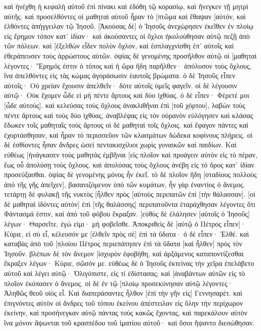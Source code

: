 καὶ ἠνέχθη ἡ κεφαλὴ αὐτοῦ ἐπὶ πίνακι καὶ ἐδόθη τῷ κορασίῳ, καὶ ἤνεγκεν τῇ μητρὶ αὐτῆς. 
καὶ προσελθόντες οἱ μαθηταὶ αὐτοῦ ἦραν τὸ [πτῶμα καὶ ἔθαψαν [αὐτόν, καὶ ἐλθόντες ἀπήγγειλαν τῷ Ἰησοῦ. 
[Ἀκούσας δὲ] ὁ Ἰησοῦς ἀνεχώρησεν ἐκεῖθεν ἐν πλοίῳ εἰς ἔρημον τόπον κατ᾽ ἰδίαν· καὶ ἀκούσαντες οἱ ὄχλοι ἠκολούθησαν αὐτῷ πεζῇ ἀπὸ τῶν πόλεων. 
καὶ [ἐξελθὼν εἶδεν πολὺν ὄχλον, καὶ ἐσπλαγχνίσθη ἐπ᾽ αὐτοῖς καὶ ἐθεράπευσεν τοὺς ἀρρώστους αὐτῶν. 
ὀψίας δὲ γενομένης προσῆλθον αὐτῷ οἱ [μαθηταὶ λέγοντες· Ἔρημός ἐστιν ὁ τόπος καὶ ἡ ὥρα ἤδη παρῆλθεν· ἀπόλυσον τοὺς ὄχλους, ἵνα ἀπελθόντες εἰς τὰς κώμας ἀγοράσωσιν ἑαυτοῖς βρώματα. 
ὁ δὲ Ἰησοῦς εἶπεν αὐτοῖς· Οὐ χρείαν ἔχουσιν ἀπελθεῖν· δότε αὐτοῖς ὑμεῖς φαγεῖν. 
οἱ δὲ λέγουσιν αὐτῷ· Οὐκ ἔχομεν ὧδε εἰ μὴ πέντε ἄρτους καὶ δύο ἰχθύας. 
ὁ δὲ εἶπεν· Φέρετέ μοι [ὧδε αὐτούς]. 
καὶ κελεύσας τοὺς ὄχλους ἀνακλιθῆναι ἐπὶ [τοῦ χόρτου], λαβὼν τοὺς πέντε ἄρτους καὶ τοὺς δύο ἰχθύας, ἀναβλέψας εἰς τὸν οὐρανὸν εὐλόγησεν καὶ κλάσας ἔδωκεν τοῖς μαθηταῖς τοὺς ἄρτους οἱ δὲ μαθηταὶ τοῖς ὄχλοις. 
καὶ ἔφαγον πάντες καὶ ἐχορτάσθησαν, καὶ ἦραν τὸ περισσεῦον τῶν κλασμάτων δώδεκα κοφίνους πλήρεις. 
οἱ δὲ ἐσθίοντες ἦσαν ἄνδρες ὡσεὶ πεντακισχίλιοι χωρὶς γυναικῶν καὶ παιδίων. 
Καὶ εὐθέως [ἠνάγκασεν τοὺς μαθητὰς ἐμβῆναι [εἰς πλοῖον καὶ προάγειν αὐτὸν εἰς τὸ πέραν, ἕως οὗ ἀπολύσῃ τοὺς ὄχλους. 
καὶ ἀπολύσας τοὺς ὄχλους ἀνέβη εἰς τὸ ὄρος κατ᾽ ἰδίαν προσεύξασθαι. ὀψίας δὲ γενομένης μόνος ἦν ἐκεῖ. 
τὸ δὲ πλοῖον ἤδη [σταδίους πολλοὺς ἀπὸ τῆς γῆς ἀπεῖχεν], βασανιζόμενον ὑπὸ τῶν κυμάτων, ἦν γὰρ ἐναντίος ὁ ἄνεμος. 
τετάρτῃ δὲ φυλακῇ τῆς νυκτὸς [ἦλθεν πρὸς [αὐτοὺς περιπατῶν ἐπὶ [τὴν θάλασσαν]. 
[οἱ δὲ μαθηταὶ ἰδόντες αὐτὸν] ἐπὶ [τῆς θαλάσσης] περιπατοῦντα ἐταράχθησαν λέγοντες ὅτι Φάντασμά ἐστιν, καὶ ἀπὸ τοῦ φόβου ἔκραξαν. 
[εὐθὺς δὲ ἐλάλησεν [αὐτοῖς ὁ Ἰησοῦς] λέγων· Θαρσεῖτε, ἐγώ εἰμι· μὴ φοβεῖσθε. 
Ἀποκριθεὶς δὲ [αὐτῷ ὁ Πέτρος εἶπεν]· Κύριε, εἰ σὺ εἶ, κέλευσόν με [ἐλθεῖν πρὸς σὲ] ἐπὶ τὰ ὕδατα· 
ὁ δὲ εἶπεν· Ἐλθέ. καὶ καταβὰς ἀπὸ τοῦ [πλοίου Πέτρος περιεπάτησεν ἐπὶ τὰ ὕδατα [καὶ ἦλθεν] πρὸς τὸν Ἰησοῦν. 
βλέπων δὲ τὸν ἄνεμον [ἰσχυρὸν ἐφοβήθη, καὶ ἀρξάμενος καταποντίζεσθαι ἔκραξεν λέγων· Κύριε, σῶσόν με. 
εὐθέως δὲ ὁ Ἰησοῦς ἐκτείνας τὴν χεῖρα ἐπελάβετο αὐτοῦ καὶ λέγει αὐτῷ· Ὀλιγόπιστε, εἰς τί ἐδίστασας; 
καὶ [ἀναβάντων αὐτῶν εἰς τὸ πλοῖον ἐκόπασεν ὁ ἄνεμος. 
οἱ δὲ ἐν τῷ [πλοίῳ προσεκύνησαν αὐτῷ λέγοντες· Ἀληθῶς θεοῦ υἱὸς εἶ. 
Καὶ διαπεράσαντες ἦλθον [ἐπὶ τὴν γῆν εἰς] Γεννησαρέτ. 
καὶ ἐπιγνόντες αὐτὸν οἱ ἄνδρες τοῦ τόπου ἐκείνου ἀπέστειλαν εἰς ὅλην τὴν περίχωρον ἐκείνην, καὶ προσήνεγκαν αὐτῷ πάντας τοὺς κακῶς ἔχοντας, 
καὶ παρεκάλουν αὐτὸν ἵνα μόνον ἅψωνται τοῦ κρασπέδου τοῦ ἱματίου αὐτοῦ· καὶ ὅσοι ἥψαντο διεσώθησαν. 
